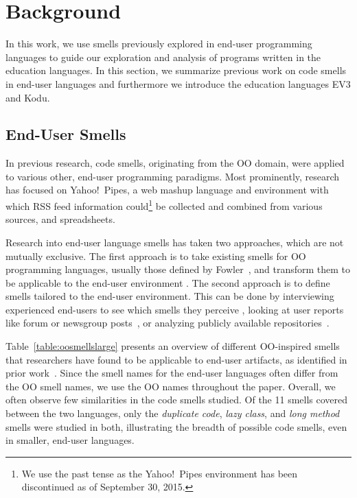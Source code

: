 \documentclass[conference]{IEEEtran}
\begin{document}
\section{Background}
\label{sec:background}
In this work, we use smells previously explored in end-user programming languages to guide our exploration and analysis of programs written in the education languages. In this section, we summarize previous work on code smells in end-user languages and furthermore we introduce the education languages EV3 and Kodu.

\subsection{End-User Smells}
\label{subsec:eusmells}
In previous research, code smells, originating from the OO domain, were applied to various other, end-user programming paradigms. 
Most prominently, research has focused on Yahoo!\ Pipes, a web mashup language and environment with which RSS feed information could\footnote{We use the past tense as the Yahoo!\ Pipes environment has been discontinued as of September 30, 2015.} be collected and combined from various sources, and spreadsheets.

Research into end-user language smells has taken two approaches, which are not mutually exclusive. The first approach is to take existing smells for OO programming languages, usually those defined by Fowler~\cite{Fowl1999}, and transform them to be applicable to the end-user environment \cite{Hermans2012inter,Hermans2012intra,Stolee2011,StoleeTSE2013, chambers2013smell}. The second approach is to define smells tailored to the end-user environment. This can be done by interviewing experienced end-users to see which smells they perceive \cite{chambers2013smell},  looking at user reports like forum or newsgroup posts~\cite{badame2012refactoring,chambers2013smell}, or  analyzing publicly available repositories~\cite{Stolee2011,StoleeTSE2013,Hermans2012intra}.

Table~\ref{table:oosmellslarge} presents an overview of different OO-inspired smells that researchers have found to be applicable to end-user artifacts, as identified in prior work~\cite{Stolee2011,StoleeTSE2013,Hermans2012intra, Hermans2012inter}.
 Since the smell names for the end-user languages often differ from the OO smell names, we use the OO names throughout the paper. Overall, we often observe  few similarities in the code smells studied. Of the 11 smells covered between the two languages, only the \emph{duplicate code}, \emph{lazy class}, and \emph{long method} smells  were studied in both, illustrating the breadth of  possible code smells, even in smaller, end-user languages.  
 
\end{document}
